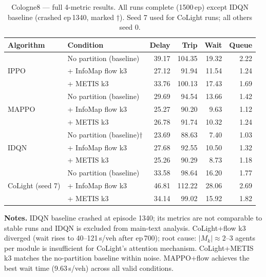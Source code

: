 \documentclass{article}
\begin{document}
\begin{table}[H]
\centering
\caption{Cologne8 --- full 4-metric results. All runs complete (1500\,ep)
    except IDQN baseline (crashed ep\,1340, marked $\dagger$).
    Seed 7 used for CoLight runs; all others seed 0.}
\label{tab:c8_full}
\small
\begin{tabular}{llrrrr}
    \toprule
    Algorithm & Condition                        & Delay & Trip   & Wait  & Queue \\
    \midrule
    \multirow{3}{*}{IPPO}
              & No partition (baseline)          & 39.17 & 104.35 & 19.32 & 2.22  \\
              & + InfoMap flow k3                & 27.12 & 91.94  & 11.54 & 1.24  \\
              & + METIS k3                       & 33.76 & 100.13 & 17.43 & 1.69  \\
    \midrule
    \multirow{3}{*}{MAPPO}
              & No partition (baseline)          & 29.69 & 94.54  & 13.66 & 1.42  \\
              & + InfoMap flow k3                & 25.27 & 90.20  & 9.63  & 1.12  \\
              & + METIS k3                       & 26.78 & 91.74  & 10.32 & 1.24  \\
    \midrule
    \multirow{3}{*}{IDQN}
              & No partition (baseline)$\dagger$ & 23.69 & 88.63  & 7.40  & 1.03  \\
              & + InfoMap flow k3                & 27.68 & 92.55  & 10.50 & 1.32  \\
              & + METIS k3                       & 25.26 & 90.29  & 8.73  & 1.18  \\
    \midrule
    \multirow{3}{*}{CoLight (seed 7)}
              & No partition (baseline)          & 33.58 & 98.64  & 16.20 & 1.77  \\
              & + InfoMap flow k3                & 46.81 & 112.22 & 28.06 & 2.69  \\
              & + METIS k3                       & 34.14 & 99.02  & 15.92 & 1.82  \\
    \bottomrule
\end{tabular}
\end{table}

\noindent\textbf{Notes.}
IDQN baseline crashed at episode 1340; its metrics are not comparable to
stable runs and IDQN is excluded from main-text analysis.
CoLight+flow k3 diverged (wait rises to 40--121\,s/veh after ep\,700);
root cause: $|M_k| \approx 2$--3 agents per module is insufficient for
CoLight's attention mechanism.
CoLight+METIS k3 matches the no-partition baseline within noise.
MAPPO+flow achieves the best wait time (9.63\,s/veh) across all valid conditions.
\end{document}
